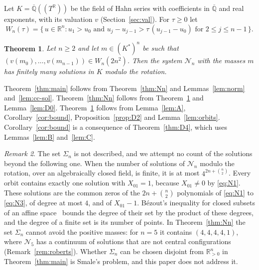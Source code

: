 \documentclass[11pt]{amsart}
\newtheorem{theorem}{Theorem}[section]
\theoremstyle{definition}
\theoremstyle{remark}
\newtheorem{remark}[theorem]{Remark}
\numberwithin{equation}{section}
\newcommand{\Qbar}{\overline{\mathbb{Q}}}
\newcommand{\RR}{\mathbb{R}}
\newcommand{\cN}{\mathcal{N}}
\begin{document}
Let $K = \Qbar((T^{\RR}))$ be the field of Hahn series with coefficients in $\Qbar$ and real exponents,
with its valuation $v$ (Section~\ref{sec:val}). For $\tau \ge 0$ let
\begin{equation}\label{eq:chamber}
  W_n(\tau) = \bigl\{\, u \in \RR^n : u_1 > u_0 \text{ and } u_j - u_{j-1} > \tau\,(u_{j-1} - u_0)
  \text{ for } 2 \le j \le n-1 \,\bigr\}.
\end{equation}

\begin{theorem}\label{thm:K}
Let $n \ge 2$ and let $m \in (K^{*})^n$ be such that $(v(m_0), \dots, v(m_{n-1})) \in W_n(2n^2)$. Then the
system $\cN_n$ with the masses $m$ has finitely many solutions in $K$ modulo the rotation.
\end{theorem}

Theorem~\ref{thm:main} follows from Theorem~\ref{thm:Nn} and Lemmas~\ref{lem:norm}
and~\ref{lem:cc-sol}. Theorem~\ref{thm:Nn} follows from Theorem~\ref{thm:K} and
Lemma~\ref{lem:D0}. Theorem~\ref{thm:K} follows from Lemma~\ref{lem:A}, Corollary~\ref{cor:bound},
Proposition~\ref{prop:D2} and Lemma~\ref{lem:orbits}. Corollary~\ref{cor:bound} is a consequence of
Theorem~\ref{thm:D4}, which uses Lemmas~\ref{lem:B} and~\ref{lem:C}.

\begin{remark}\label{rem:scope}
The set $\Sigma_n$ is not described, and we attempt no count of the solutions beyond the following one.
When the number of solutions of $\cN_n$ modulo the rotation, over an algebraically closed field, is
finite, it is at most $4^{2n + \binom{n}{2}}$. Every orbit contains exactly one solution with
$X_{01} = 1$, because $X_{01} \ne 0$ by \eqref{eq:N1}. These solutions are the common zeros of the
$2n + \binom{n}{2}$ polynomials of \eqref{eq:N1} to \eqref{eq:N3}, of degree at most $4$, and of
$X_{01} - 1$. B\'ezout's inequality for closed subsets of an affine
space~\cite[Theorem~1, with the corrigendum]{heintz1983} bounds the degree of their set by the product of these degrees, and
the degree of a finite set is its number of points. In
Theorem~\ref{thm:Nn} the set $\Sigma_n$ cannot avoid the positive masses: for $n = 5$ it contains
$(4, 4, 4, 4, 1)$, where $\cN_5$ has a continuum of solutions that are not central configurations
(Remark~\ref{rem:roberts}). Whether $\Sigma_n$ can be chosen disjoint from $\RR_{>0}^n$ in
Theorem~\ref{thm:main} is Smale's problem, and this paper does not address it.
\end{remark}
\end{document}
